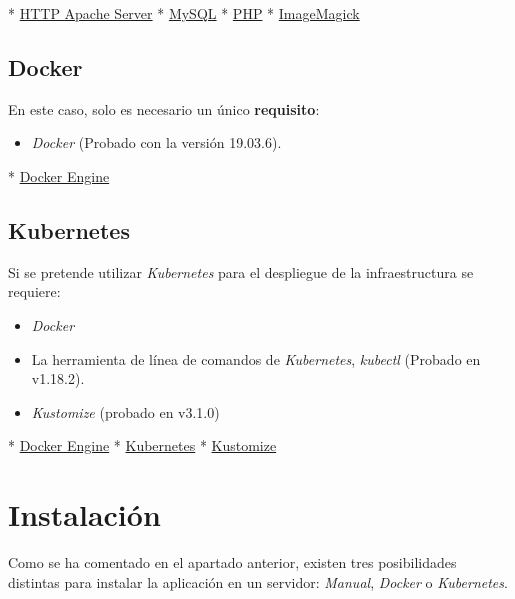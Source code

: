 \documentclass[
]{article}
\providecommand{\tightlist}{%
  \setlength{\itemsep}{0pt}\setlength{\parskip}{0pt}}
\begin{document}
* \href{http://httpd.apache.org/docs/trunk/es/install.html}{HTTP Apache
Server} *
\href{https://dev.mysql.com/doc/mysql-installation-excerpt/5.7/en/}{MySQL}
* \href{https://www.php.net/manual/es/install.php}{PHP} *
\href{https://imagemagick.org/script/install-source.php}{ImageMagick}

\hypertarget{docker}{%
\subsection{Docker}\label{docker}}

En este caso, solo es necesario un único \textbf{requisito}:

\begin{itemize}
\tightlist
\item
  \emph{Docker} (Probado con la versión 19.03.6).
\end{itemize}

* \href{https://docs.docker.com/engine/install/}{Docker Engine}

\hypertarget{kubernetes}{%
\subsection{Kubernetes}\label{kubernetes}}

Si se pretende utilizar \emph{Kubernetes} para el despliegue de la
infraestructura se requiere:

\begin{itemize}
\tightlist
\item
  \emph{Docker}
\item
  La herramienta de línea de comandos de \emph{Kubernetes},
  \emph{kubectl} (Probado en v1.18.2).
\item
  \emph{Kustomize} (probado en v3.1.0)
\end{itemize}

* \href{https://docs.docker.com/engine/install/}{Docker Engine} *
\href{https://kubernetes.io/es/docs/tasks/tools/install-kubectl/}{Kubernetes}
* \href{https://github.com/kubernetes-sigs/kustomize}{Kustomize}

\hypertarget{instalaciuxf3n}{%
\section{Instalación}\label{instalaciuxf3n}}

Como se ha comentado en el apartado anterior, existen tres posibilidades
distintas para instalar la aplicación en un servidor: \emph{Manual},
\emph{Docker} o \emph{Kubernetes}.
\end{document}
